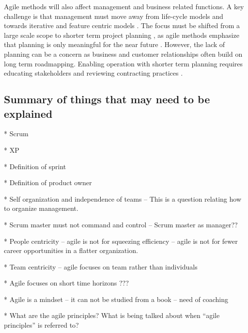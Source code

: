 Agile methods will also affect management and business related functions. A key
challenge is that management must move away from life-cycle models and towards
iterative and feature centric models \cite{Nerur2005}. The focus must be shifted
from a large scale scope to shorter term project planning \cite{Misra2010}, as
agile methods emphasize that planning is only meaningful for the near future
\cite{Cohn2003}. However, the lack of planning can be a concern as business and
customer relationships often build on long term roadmapping. Enabling operation
with shorter term planning requires educating stakeholders and reviewing
contracting practices \cite{Boehm2005}.


% 

% 


\subsection{Summary of things that may need to be explained}

* Scrum

* XP

* Definition of sprint

* Definition of product owner

* Self organization and independence of teams -- This is a question relating how
  to organize management. 

* Scrum master must not command and control -- Scrum master as manager??

* People centricity -- agile is not for squeezing efficiency -- agile is not for
  fewer career opportunities in a flatter organization.

* Team centricity -- agile focuses on team rather than individuals

* Agile focuses on short time horizons ???

* Agile is a mindset -- it can not be studied from a book -- need of coaching

* What are the agile principles? What is being talked about when ``agile
  principles'' is referred to?

